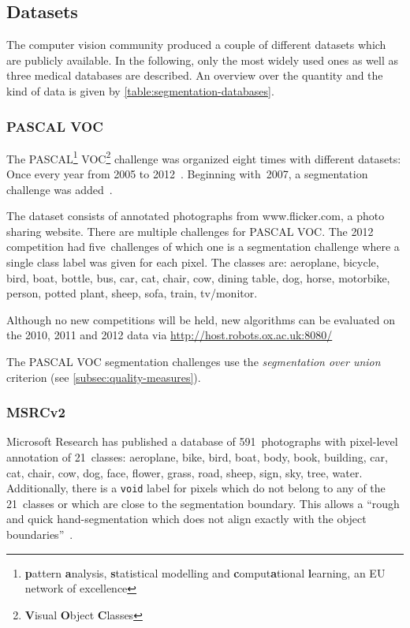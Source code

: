 
\subsection{Datasets}

The computer vision community produced a couple of different datasets which are
publicly available. In the following, only the most widely used ones as well as
three medical databases are described. An overview over the quantity and
the kind of data is given by
\cref{table:segmentation-databases}.


\subsubsection{PASCAL VOC}

The PASCAL\footnote{\textbf{p}attern \textbf{a}nalysis, \textbf{s}tatistical
modelling and \textbf{c}omput\textbf{a}tional \textbf{l}earning, an EU network
of excellence} VOC\footnote{\textbf{V}isual \textbf{O}bject \textbf{C}lasses}
challenge was organized eight times with different datasets: Once every year
from 2005 to 2012~\cite{pascal-voc-2012}. Beginning with~2007, a segmentation
challenge was added~\cite{pascal-voc-2007}.

The dataset consists of annotated photographs from www.flicker.com, a photo
sharing website. There are multiple challenges for PASCAL VOC\@. The 2012
competition had five~challenges of which one is a segmentation challenge where
a single class label was given for each pixel. The classes are: aeroplane,
bicycle, bird, boat, bottle, bus, car, cat, chair, cow, dining table, dog,
horse, motorbike, person, potted plant, sheep, sofa, train, tv/monitor.

Although no new competitions will be held, new algorithms can be evaluated on
the 2010, 2011 and 2012 data via
\href{http://host.robots.ox.ac.uk:8080/}{http://host.robots.ox.ac.uk:8080/}

The PASCAL VOC segmentation challenges use the \textit{segmentation over union}
criterion (see \cref{subsec:quality-measures}).


\subsubsection{MSRCv2}\label{subsubsec:MSRCv2}

Microsoft Research has published a database of 591~photographs with pixel-level
annotation of 21~classes: aeroplane, bike, bird, boat, body, book, building,
car, cat, chair, cow, dog, face, flower, grass, road, sheep, sign, sky, tree,
water. Additionally, there is a \texttt{void} label for pixels which do not
belong to any of the 21~classes or which are close to the segmentation
boundary. This allows a \enquote{rough and quick hand-segmentation which does
not align exactly with the object boundaries}~\cite{shotton2006textonboost}.

